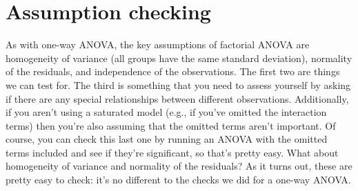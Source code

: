 \section{Assumption checking~\label{sec:factorialanovaassumptions}} 

As with one-way ANOVA, the key assumptions of factorial ANOVA are homogeneity of variance (all groups have the same standard deviation), normality of the residuals, and independence of the observations. The first two are things we can test for. The third is something that you need to assess yourself by asking if there are any special relationships between different observations. Additionally, if you aren't using a saturated model (e.g., if you've omitted the interaction terms) then you're also assuming that the omitted terms aren't important. Of course, you can check this last one by running an ANOVA with the omitted terms included and see if they're significant, so that's pretty easy. What about homogeneity of variance and normality of the residuals? As it turns out, these are pretty easy to check: it's no different to the checks we did for a one-way ANOVA.


